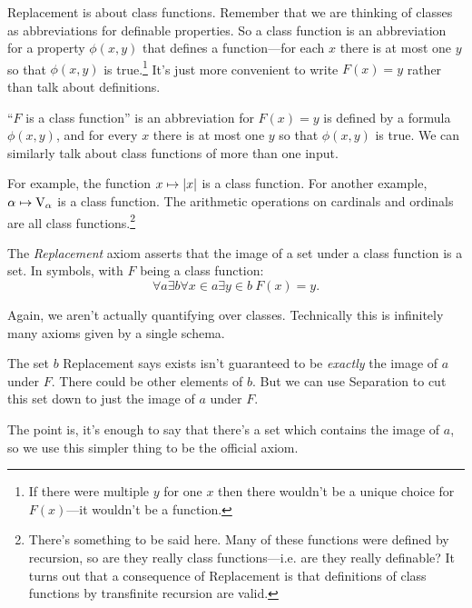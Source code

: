 \documentclass[10pt]{amsart}
\begin{document}
Replacement is about class functions. Remember that we are thinking of classes as abbreviations for definable properties. So a class function is an abbreviation for a property $\phi(x,y)$ that defines a function---for each $x$ there is at most one $y$ so that $\phi(x,y)$ is true.\footnote{If there were multiple $y$ for one $x$ then there wouldn't be a unique choice for $F(x)$---it wouldn't be a function.} It's just more convenient to write $F(x) = y$ rather than talk about definitions.

\begin{definition}
``$F$ is a class function'' is an abbreviation for $F(x) = y$ is defined by a formula $\phi(x,y)$, and for every $x$ there is at most one $y$ so that $\phi(x,y)$ is true. We can similarly talk about class functions of more than one input.
\end{definition}

For example, the function $x \mapsto \left\lvert x \right\rvert$ is a class function. For another example, $\alpha \mapsto \mathrm{V}_\alpha$ is a class function. The arithmetic operations on cardinals and ordinals are all class functions.\footnote{There's something to be said here. Many of these functions were defined by recursion, so are they really class functions---i.e. are they really definable? It turns out that a consequence of Replacement is that definitions of class functions by transfinite recursion are valid.}

\begin{definition}
The \emph{Replacement} axiom asserts that the image of a set under a class function is a set. In symbols, with $F$ being a class function:
\[
\tag{Replacement}
\forall a \exists b \forall x \in a \exists y \in b\ F(x) = y.
\]
\end{definition}

\begin{remark}
Again, we aren't actually quantifying over classes. Technically this is infinitely many axioms given by a single schema.
\end{remark}

\begin{remark}
The set $b$ Replacement says exists isn't guaranteed to be \emph{exactly} the image of $a$ under $F$. There could be other elements of $b$. But we can use Separation to cut this set down to just the image of $a$ under $F$.

The point is, it's enough to say that there's a set which contains the image of $a$, so we use this simpler thing to be the official axiom.
\end{remark}
\end{document}
